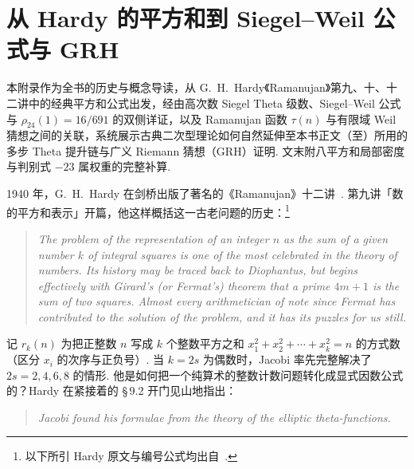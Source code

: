 \chapter{从 Hardy 的平方和到 Siegel--Weil 公式与 GRH}
\label{app:hardy-theta-intro}

\begin{chapterguide}
本附录作为全书的历史与概念导读，从 G.~H.~Hardy《Ramanujan》第九、十、十二讲中的经典平方和公式出发，经由高次数 Siegel Theta 级数、Siegel--Weil 公式与 $\rho_{24}(1)=16/691$ 的双侧详证，以及 Ramanujan 函数 $\tau(n)$ 与有限域 Weil 猜想之间的关联，系统展示古典二次型理论如何自然延伸至本书正文（至）所用的多步 Theta 提升链与广义 Riemann 猜想（GRH）证明. 文末附八平方和局部密度与判别式 $-23$ 属权重的完整补算.
\end{chapterguide}

1940 年，G.~H.~Hardy 在剑桥出版了著名的《Ramanujan》十二讲~\cite{Hardy1940}. 第九讲「数的平方和表示」开篇，他这样概括这一古老问题的历史：\footnote{以下所引 Hardy 原文与编号公式均出自~\cite[第九讲，\S\,9.1--\S\,9.17，第~132--155~页]{Hardy1940}.}
\begin{quote}
\itshape
The problem of the representation of an integer $n$ as the sum of a given number $k$ of integral squares is one of the most celebrated in the theory of numbers. Its history may be traced back to Diophantus, but begins effectively with Girard's (or Fermat's) theorem that a prime $4m+1$ is the sum of two squares. Almost every arithmetician of note since Fermat has contributed to the solution of the problem, and it has its puzzles for us still.
\end{quote}

记 $r_k(n)$ 为把正整数 $n$ 写成 $k$ 个整数平方之和 $x_1^2+x_2^2+\cdots+x_k^2=n$ 的方式数（区分 $x_i$ 的次序与正负号）. 当 $k=2s$ 为偶数时，Jacobi 率先完整解决了 $2s=2,4,6,8$ 的情形. 他是如何把一个纯算术的整数计数问题转化成显式因数公式的？Hardy 在紧接着的 \S\,9.2 开门见山地指出：
\begin{quote}
\itshape
Jacobi found his formulae from the theory of the elliptic theta-functions.
\end{quote}

